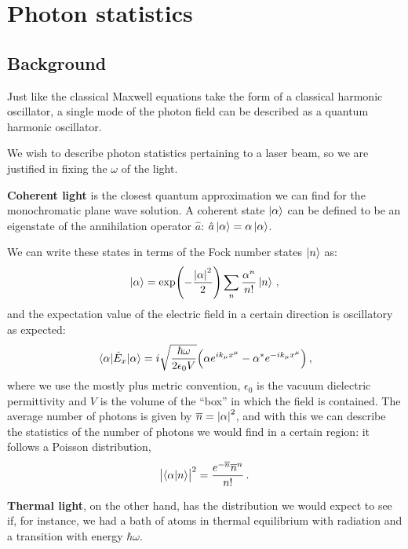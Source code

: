 \documentclass[main.tex]{subfiles}
\begin{document}
\section{Photon statistics}

\subsection{Background}

Just like the classical Maxwell equations take the form of a classical harmonic oscillator, a single mode of the photon field can be described as a quantum harmonic oscillator.

We wish to describe photon statistics pertaining to a laser beam, so we are justified in fixing the \(\omega \) of the light.

\textbf{Coherent light} is the closest quantum approximation we can find for the monochromatic plane wave solution. A coherent state \(\ket{\alpha } \) can be defined to be an eigenstate of the annihilation operator \(\hat{a}\): \(\hat{a} \ket{\alpha } = \alpha \ket{\alpha }\). 

We can write these states in terms of the Fock number states \(\ket{n}\) as: 
%
\begin{align}
\ket{\alpha } = \exp(- \frac{\abs{\alpha }^2}{2}) 
\sum _{n} \frac{\alpha^{n}}{n!} \ket{n}
\,,
\end{align}
%
and the expectation value of the electric field in a certain direction is oscillatory as expected: 
%
\begin{align}
\ev{\hat{E}_x}{\alpha } = i \sqrt{\frac{\hbar \omega }{ 2 \epsilon_0 V}} \qty( \alpha  e^{i k_\mu x^{\mu }} - \alpha^{*} e^{-i k_\mu x^{\mu }} )
\,,
\end{align}
%
where we use the mostly plus metric convention, \(\epsilon_0 \) is the vacuum dielectric permittivity and \(V\) is the volume of the ``box'' in which the field is contained. 
The average number of photons is given by \(\overline{n} = \abs{\alpha }^2\), and with this we can describe the statistics of the number of photons we would find in a certain region: it follows a Poisson distribution, 
%
\begin{align}
\abs{\braket{\alpha }{n}}^2 = \frac{e^{-\overline{n}} \overline{n}^{n}}{n!}
\,.
\end{align}

\textbf{Thermal light}, on the other hand, has the distribution we would expect to see if, for instance, we had a bath of atoms in thermal equilibrium with radiation and a transition with energy \(\hbar \omega \).
\end{document}
